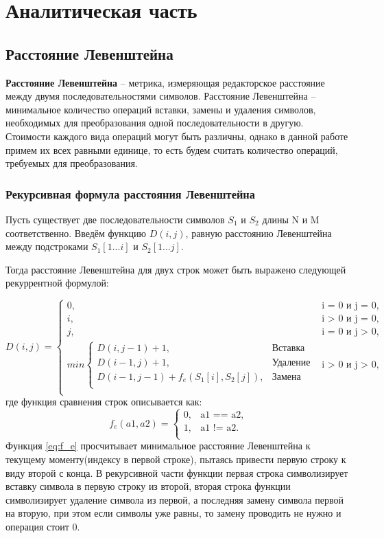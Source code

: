 \chapter{Аналитическая часть}
\section{Расстояние Левенштейна}
\textbf{Расстояние Левенштейна} – метрика, измеряющая редакторское расстояние между двумя последовательностями символов. Расстояние Левенштейна – минимальное количество операций вставки, замены и удаления символов, необходимых для преобразования одной последовательности в другую. Стоимости каждого вида операций могут быть различны, однако в данной работе примем их всех равными единице, то есть будем считать количество операций, требуемых для преобразования.

\subsection{Рекурсивная формула расстояния Левенштейна}

Пусть существует две последовательности символов $S_1$ и $S_2$ длины N и M соответственно. Введём функцию $D(i, j)$, равную расстоянию Левенштейна между подстроками $S_1[1...i]$ и $S_2[1...j]$.

Тогда расстояние Левенштейна для двух строк может быть выражено следующей рекуррентной формулой:

\begin{equation}
	\label{eq:D}
	D(i, j) = 
	\begin{cases}
		0, &\text{i = 0 и j = 0},\\
		i, &\text{i > 0 и j = 0},\\
		j, &\text{i = 0 и j > 0},\\
		min \begin{cases}
			D(i, j - 1) + 1, &\text{Вставка}\\
			D(i - 1, j) + 1, &\text{Удаление}\\
			D(i - 1, j - 1) + f_e(S_1[i], S_2[j]), &\text{Замена}\\
		\end{cases} &\text{i > 0 и j > 0},\\
	\end{cases}
\end{equation}
где функция сравнения строк описывается как:
\begin{equation}
	\label{eq:f_e}
	f_e(a1, a2) = 
	\begin{cases}
		0, &\text{a1 == a2},\\
		1, &\text{a1 != a2}.\\
	\end{cases}
\end{equation}
Функция \ref{eq:f_e} просчитывает минимальное расстояние Левенштейна к текущему моменту(индексу в первой строке), пытаясь привести первую строку к виду второй с конца. В рекурсивной части функции первая строка символизирует вставку символа в первую строку из второй, вторая строка функции символизирует удаление символа из первой, а последняя замену символа первой на вторую, при этом если символы уже равны, то замену проводить не нужно и операция стоит 0.

